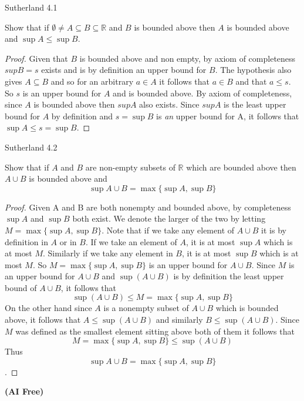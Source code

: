 \documentclass[minion]{homework}
\newcommand{\Reals}{\ensuremath{\mathbb R}}%
\begin{document}
\begin{problems}
\problem Sutherland 4.1

Show that if $\emptyset \neq A \subseteq B \subseteq \Reals $ and $B$ is bounded above then $A$ is bounded above and $\sup A \leq \sup B$.
\newline
\begin{proof}
  Given that $B$ is bounded above and non empty, by axiom of completeness $sup B = s$ exists and is by definition an upper bound for $B$. The hypothesis also gives $A \subseteq B$ and so for an arbitrary $a \in A$ it follows that $a \in B$ and that $a \leq s$. So $s$ is an upper bound for $A$ and is bounded above. By axiom of completeness, since $A$ is bounded above then $sup A$ also exists. Since $sup A$ is the least upper bound for $A$ by definition and $s = \sup B$ is \emph{an} upper bound for A, it follows that $\sup A \leq s = \sup B$.
\end{proof}

\problem Sutherland 4.2

Show that if $A$ and $B$ are non-empty subsets of $\Reals$ which are bounded above then $A \cup B$ is bounded above and $$\sup A \cup B = \max\{\sup A, \sup B\} $$ 
\newline
\begin{proof}
  Given A and B are both nonempty and bounded above, by completeness $\sup A$ and $\sup B$ both exist. We denote the larger of the two by letting $M = \max\{\sup A, \sup B\}$. Note that if we take any element of $A \cup B$ it is by definition in $A$ or in $B$. If we take an element of $A$, it is at most $\sup A$ which is at most $M$. Similarly if we take any element in $B$, it is at most $\sup B$ which is at most $M$. So $M = \max\{\sup A, \sup B\}$ is an upper bound for $A \cup B$. Since $M$ is an upper bound for $A \cup B$ and $\sup(A \cup B)$ is by definition the least upper bound of $A \cup B$, it follows that $$\sup(A \cup B) \leq M = \max\{\sup A, \sup B\}$$
  On the other hand since $A$ is a nonempty subset of $A \cup B$ which is bounded above, it follows that $A \leq \sup(A \cup B)$ and similarly $B \leq \sup(A \cup B)$. Since $M$ was defined as the smallest element sitting above both of them it follows that $$M = \max\{\sup A, \sup B\} \leq \sup(A \cup B)$$
  Thus 
  $$\sup A \cup B = \max\{\sup A, \sup B\}$$.
\end{proof}

\problem \textbf{(AI Free)}


\end{problems}
\end{document}
